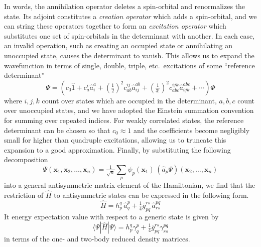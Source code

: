 In words, the annihilation operator deletes a spin-orbital and renormalizes the
state.
Its adjoint constitutes a {\itshape creation operator} which adds a
spin-orbital, and we can string these operators together to form an {\itshape
excitation operator} which substitutes one set of spin-orbitals in the
determinant with another.
In each case, an invalid operation, such as creating an occupied state or
annihilating an unoccupied state, causes the determinant to vanish.
This allows us to expand the wavefunction in terms of single, double, triple,
etc.\ excitations of some ``reference determinant''
\begin{equation}
    \label{eq:intro-ci-expansion}
    \Psi
    =
    \left(
        c_0
        \hat{1}
        +
        c_a^i
        \hat{a}^a_i
        +
        (\tfrac{1}{2})^2
        c_{ab}^{ij}
        \hat{a}^{ab}_{ij}
        +
        (\tfrac{1}{3!})^2
        c_{abc}^{ijk}
        \hat{a}^{abc}_{ijk}
        +
        \cdots
    \right)
    \Phi
\end{equation}
where \(i, j, k\) count over states which are occupied in the determinant, \(a,
b, c\) count over unoccupied states, and we have adopted the Einstein summation
convention for summing over repeated indices.
For weakly correlated states, the reference determinant can be chosen so that
\(c_0 \approx 1\) and the coefficients become negligibly small for higher than
quadruple excitations, allowing us to truncate this expansion to a good
approximation.
Finally, by substituting the following decomposition
\begin{equation}
    \Psi(\mathbf{x}_1, \mathbf{x}_2, \ldots, \mathbf{x}_n)
    =
    \tfrac{1}{\sqrt{n}}
    \sum_p
    \psi_p(\mathbf{x}_1)\,
    (\hat{a}_p\Psi)(\mathbf{x}_2, \ldots, \mathbf{x}_n)
\end{equation}
into a general antisymmetric matrix element of the Hamiltonian, we find that the
restriction of \(\hat{H}\) to antisymmetric states can be expressed in the
following form.
\begin{equation}
    \hat{H}
    =
    h_p^q\,
    \hat{a}^p_q
    +
    \tfrac{1}{4}
    \overline{g}_{pq}^{rs}\,
    \hat{a}^{pq}_{rs}
\end{equation}
It energy expectation value with respect to a generic state is given by
\begin{equation}
    \langle\Psi|
    \hat{H}
    |\Psi\rangle
    =
    h_p^q
    \gamma^p_q
    +
    \tfrac{1}{4}
    \overline{g}_{pq}^{rs}
    \gamma^{pq}_{rs}
\end{equation}
in terms of the one- and two-body reduced density matrices.
